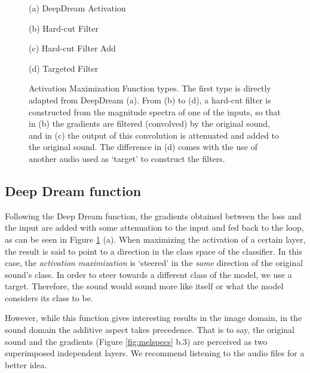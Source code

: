 \documentclass[a4paper,10pt,oneside]{article}
\begin{document}
\begin{sloppy}
\begin{figure}[H]
\begin{minipage}[h]{0.5\columnwidth}
  \centerline{}
  \centerline{(a) DeepDream Activation}\medskip
\end{minipage}
\begin{minipage}[h]{0.5\columnwidth}
  \centerline{}
  \centerline{(b) Hard-cut Filter}\medskip
\end{minipage}
\begin{minipage}[h]{0.5\columnwidth}
  \centerline{}
  \centerline{(c) Hard-cut Filter Add}\medskip
\end{minipage}
\begin{minipage}[h]{0.5\columnwidth}
  \centerline{}
  \centerline{(d) Targeted Filter }\medskip
\end{minipage}
\caption{Activation Maximization Function types. The first type is directly adapted from DeepDream (a). From (b) to (d), a hard-cut filter is constructed from the magnitude spectra of one of the inputs, so that in (b) the gradients are filtered (convolved) by the original sound, and in (c) the output of this convolution is attenuated and added to the original sound. The difference in (d) comes with the use of another audio used as `target' to construct the filters.}
\label{fig:maxfun}
\end{figure}

\subsection{Deep Dream function}
Following the Deep Dream function, the gradients obtained between the loss and the input are added with some attenuation to the input and fed back to the loop, as can be seen in Figure \ref{fig:maxfun} (a).  When maximizing the activation of a certain layer, the result is said to point to a direction in the class space of the classifier. In this case, the \textit{activation maximization} is `steered' in the \textit{same} direction of the original sound's class. In order to steer towards a different class of the model, we use a target. Therefore, the sound would sound more like itself or what the model considers its class to be. 

However, while this function gives interesting results in the image domain, in the sound domain the additive aspect takes precedence. That is to say, the original sound and the gradients (Figure \ref{fig:melspecs} b.3) are perceived as two superimposed independent layers. We recommend listening to the audio files for a better idea.



\end{sloppy}
\end{document}
